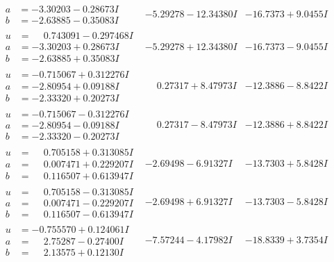 \documentclass[1p]{elsarticle_modified}
\theoremstyle{definition}
\begin{document}
$$\begin{array}{c|c|c}
\begin{aligned}
a &= -3.30203 - 0.28673 I \\
b &= -2.63885 - 0.35083 I\end{aligned}
 & -5.29278 - 12.34380 I & -16.7373 + 9.0455 I \\ \hline\begin{aligned}
u &= \phantom{-}0.743091 - 0.297468 I \\
a &= -3.30203 + 0.28673 I \\
b &= -2.63885 + 0.35083 I\end{aligned}
 & -5.29278 + 12.34380 I & -16.7373 - 9.0455 I \\ \hline\begin{aligned}
u &= -0.715067 + 0.312276 I \\
a &= -2.80954 + 0.09188 I \\
b &= -2.33320 + 0.20273 I\end{aligned}
 & \phantom{-}0.27317 + 8.47973 I & -12.3886 - 8.8422 I \\ \hline\begin{aligned}
u &= -0.715067 - 0.312276 I \\
a &= -2.80954 - 0.09188 I \\
b &= -2.33320 - 0.20273 I\end{aligned}
 & \phantom{-}0.27317 - 8.47973 I & -12.3886 + 8.8422 I \\ \hline\begin{aligned}
u &= \phantom{-}0.705158 + 0.313085 I \\
a &= \phantom{-}0.007471 + 0.229207 I \\
b &= \phantom{-}0.116507 + 0.613947 I\end{aligned}
 & -2.69498 - 6.91327 I & -13.7303 + 5.8428 I \\ \hline\begin{aligned}
u &= \phantom{-}0.705158 - 0.313085 I \\
a &= \phantom{-}0.007471 - 0.229207 I \\
b &= \phantom{-}0.116507 - 0.613947 I\end{aligned}
 & -2.69498 + 6.91327 I & -13.7303 - 5.8428 I \\ \hline\begin{aligned}
u &= -0.755570 + 0.124061 I \\
a &= \phantom{-}2.75287 - 0.27400 I \\
b &= \phantom{-}2.13575 + 0.12130 I\end{aligned}
 & -7.57244 - 4.17982 I & -18.8339 + 3.7354 I \\ \hline\begin{aligned}

\end{aligned}
\end{array}$$
\end{document}
